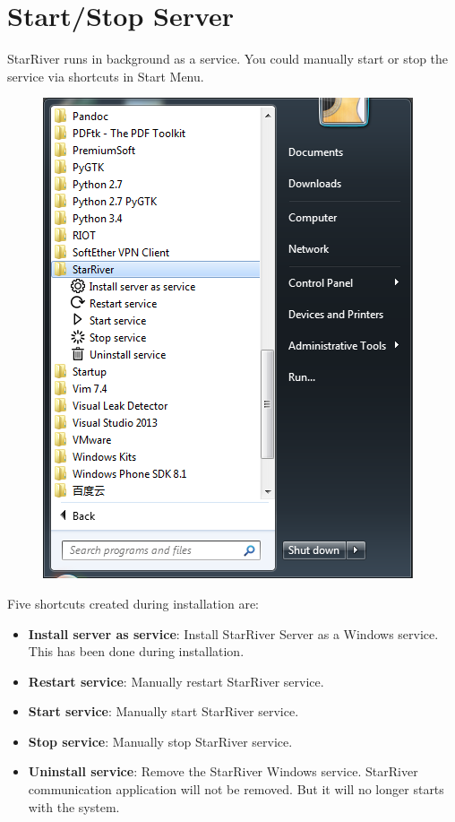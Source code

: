 \section{Start/Stop Server}\label{startstop-server}

StarRiver runs in background as a service. You could manually start or
stop the service via shortcuts in Start Menu.

\begin{figure}[htbp]
\centering
\includegraphics{img/shortcuts.png}
\end{figure}

Five shortcuts created during installation are:

\begin{itemize}
\itemsep1pt\parskip0pt
\item
  \textbf{Install server as service}: Install StarRiver Server as a
  Windows service. This has been done during installation.
\item
  \textbf{Restart service}: Manually restart StarRiver service.
\item
  \textbf{Start service}: Manually start StarRiver service.
\item
  \textbf{Stop service}: Manually stop StarRiver service.
\item
  \textbf{Uninstall service}: Remove the StarRiver Windows service.
  StarRiver communication application will not be removed. But it will
  no longer starts with the system.
\end{itemize}
